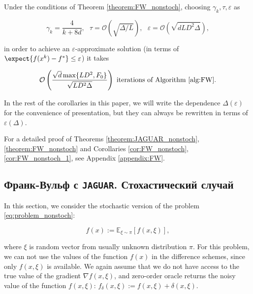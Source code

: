         \begin{corollary}
        \label{cor:FW_nonstoch_1}
            Under the conditions of Theorem \ref{theorem:FW_nonstoch}, choosing $\gamma_k, \tau, \varepsilon$ as

            \begin{equation*}
                \gamma_k = \frac{4}{k + 8d}, \text{ }
                \tau = \mathcal{O} \left( \sqrt{\Delta / L}\right), \text{ }
                \varepsilon = \mathcal{O} \left( \sqrt{d L D^2 \Delta}\right),
            \end{equation*}

            in order to achieve an $\varepsilon$-approximate solution (in terms of $\expect{f(x^k) - f^*} \leq \varepsilon$) it takes

            \begin{equation*}
                \mathcal{O} \left( \frac{\sqrt{d} \max\{L D^2, F_0\}}{\sqrt{L D^2 \Delta}} \right) \text{ iterations of Algorithm \ref{alg:FW}.}
            \end{equation*}
        \end{corollary}

        In the rest of the corollaries in this paper, we will write the dependence $\Delta(\varepsilon)$ for the convenience of presentation, but they can always be rewritten in terms of $\varepsilon(\Delta)$.

        For a detailed proof of Theorems  \ref{theorem:JAGUAR_nonstoch}, \ref{theorem:FW_nonstoch} and Corollaries \ref{cor:FW_nonstoch}, \ref{cor:FW_nonstoch_1}, see Appendix \ref{appendix:FW}. 
        
\subsection{Франк-Вульф с \texttt{JAGUAR}. Стохастический случай} \label{sect:JAGUAR_stoch}



        In this section, we consider the stochastic version of the problem \eqref{eq:problem_nonstoch}:
  
        \begin{equation}
        \label{eq:problem_stoch}
            f(x) := 
            \mathbb{E}_{\xi \sim \pi}\left[f(x, \xi)\right],
        \end{equation}
    
        where $\xi$ is random vector from usually unknown distribution $\pi$. 
        For this problem, we can not use the values of the function $f(x)$ in the difference schemes, since only $f(x, \xi)$ is available. We again assume that we do not have access to the true value of the gradient $\nabla f(x, \xi)$, and zero-order oracle returns the noisy value of the function $f(x, \xi)$: $f_{\delta}(x, \xi) := f(x, \xi) + \delta(x, \xi).$
        


